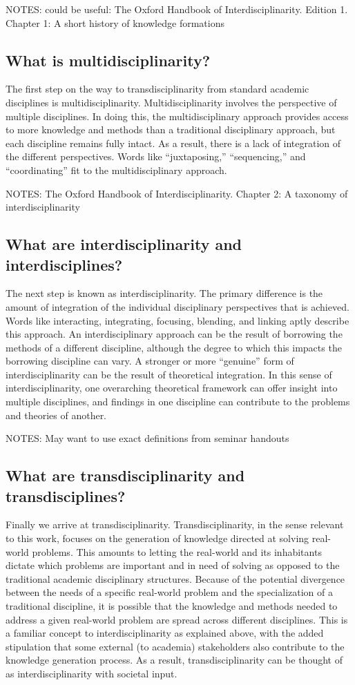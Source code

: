 \documentclass{lps}
\begin{document}
NOTES:
could be useful: The Oxford Handbook of Interdisciplinarity. Edition 1. Chapter 1: A short history of knowledge formations

\subsection{What is multidisciplinarity?}
The first step on the way to transdisciplinarity from standard academic disciplines is multidisciplinarity. Multidisciplinarity involves the perspective of multiple disciplines. In doing this, the multidisciplinary approach provides access to more knowledge and methods than a traditional disciplinary approach, but each discipline remains fully intact. As a result, there is a lack of integration of the different perspectives. Words like “juxtaposing,” “sequencing,” and “coordinating” fit to the multidisciplinary approach.

NOTES:
The Oxford Handbook of Interdisciplinarity. Chapter 2: A taxonomy of interdisciplinarity

\subsection{What are interdisciplinarity and interdisciplines?}
The next step is known as interdisciplinarity. The primary difference is the amount of integration of the individual disciplinary perspectives that is achieved. Words like interacting, integrating, focusing, blending, and linking aptly describe this approach. An interdisciplinary approach can be the result of borrowing the methods of a different discipline, although the degree to which this impacts the borrowing discipline can vary. A stronger or more “genuine” form of interdisciplinarity can be the result of theoretical integration. In this sense of interdisciplinarity, one overarching theoretical framework can offer insight into multiple disciplines, and findings in one discipline can contribute to the problems and theories of another.

NOTES:
May want to use exact definitions from seminar handouts
\subsection{What are transdisciplinarity and transdisciplines?}
Finally we arrive at transdisciplinarity. Transdisciplinarity, in the sense relevant to this work, focuses on the generation of knowledge directed at solving real-world problems. This amounts to letting the real-world and its inhabitants dictate which problems are important and in need of solving as opposed to the traditional academic disciplinary structures. Because of the potential divergence between the needs of a specific real-world problem and the specialization of a traditional discipline, it is possible that the knowledge and methods needed to address a given real-world problem are spread across different disciplines. This is a familiar concept to interdisciplinarity as explained above, with the added stipulation that some external (to academia) stakeholders also contribute to the knowledge generation process. As a result, transdisciplinarity can be thought of as interdisciplinarity with societal input. 
\end{document}
